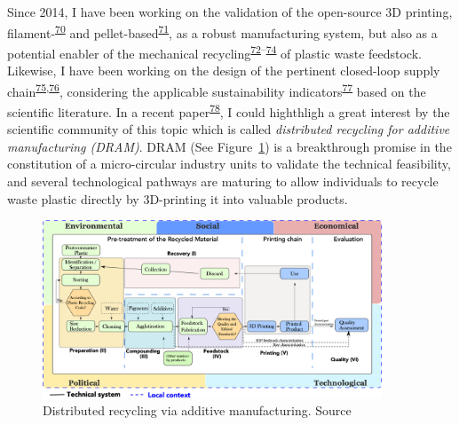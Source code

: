 \documentclass[
  11pt,
  a4paperpaper,
  onecolumn]{article}
\begin{document}
Since 2014, I have been working on the validation of the open-source 3D
printing,
filament-\textsuperscript{\protect\hyperlink{ref-CruzSanchez2014}{70}}
and
pellet-based\textsuperscript{\protect\hyperlink{ref-Arthur2020}{71}}, as
a robust manufacturing system, but also as a potential enabler of the
mechanical
recycling\textsuperscript{\protect\hyperlink{ref-Cruz2015}{72}--\protect\hyperlink{ref-lopez2022}{74}}
of plastic waste feedstock. Likewise, I have been working on the design
of the pertinent closed-loop supply
chain\textsuperscript{\protect\hyperlink{ref-Pavlo2018}{75},\protect\hyperlink{ref-Santander2020}{76}},
considering the applicable sustainability
indicators\textsuperscript{\protect\hyperlink{ref-Santander2022}{77}}
based on the scientific literature. In a recent
paper\textsuperscript{\protect\hyperlink{ref-CruzSanchez2020}{78}}, I
could highthligh a great interest by the scientific community of this
topic which is called \emph{distributed recycling for additive
manufacturing (DRAM)}. DRAM (See Figure~\ref{fig-DRAM}) is a
breakthrough promise in the constitution of a micro-circular industry
units to validate the technical feasibility, and several technological
pathways are maturing to allow individuals to recycle waste plastic
directly by 3D-printing it into valuable products.

\begin{figure}

{\centering \includegraphics[width=0.9\textwidth,height=\textheight]{Figures/SDRAM-00.png}

}

\caption{\label{fig-DRAM}Distributed recycling via additive
manufacturing. Source}

\end{figure}
\end{document}
